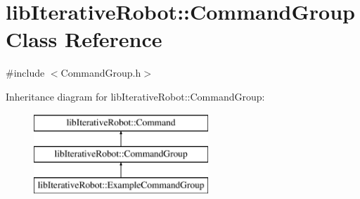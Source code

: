 \hypertarget{classlib_iterative_robot_1_1_command_group}{}\section{lib\+Iterative\+Robot\+::Command\+Group Class Reference}
\label{classlib_iterative_robot_1_1_command_group}


{\ttfamily \#include $<$Command\+Group.\+h$>$}

Inheritance diagram for lib\+Iterative\+Robot\+::Command\+Group\+:\begin{figure}[H]
\begin{center}
\leavevmode
\includegraphics[height=3.000000cm]{classlib_iterative_robot_1_1_command_group}
\end{center}
\end{figure}
